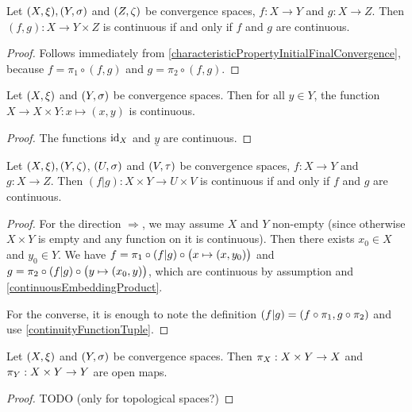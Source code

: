 \begin{lemma} \label{continuityFunctionTuple}
Let $\sSet{X,\xi}, \sSet{Y,\sigma}$ and $\sSet{Z,\zeta}$ be convergence spaces, $f: X\to Y$ and $g: X\to Z$. Then $(f,g): X\to Y\times Z$ is continuous \textup{if and only if} $f$ and $g$ are continuous.
\end{lemma}
\begin{proof}
Follows immediately from \ref{characteristicPropertyInitialFinalConvergence},
because $f = \pi_1\circ (f,g)$ and $g = \pi_2\circ (f,g)$.
\end{proof}
\begin{corollary} \label{continuousEmbeddingProduct}
Let $\sSet{X,\xi}$ and $\sSet{Y,\sigma}$ be convergence spaces. Then for all $y\in Y$, the function $X\to X\times Y: x\mapsto (x,y)$ is continuous.
\end{corollary}
\begin{proof}
The functions $\operatorname{id}_X$ and $\underline{y}$ are continuous.
\end{proof}

\begin{lemma} \label{continuityParallelComposition}
Let $\sSet{X,\xi}, \sSet{Y,\zeta}$, $\sSet{U,\sigma}$ and $\sSet{V,\tau}$ be convergence spaces, $f: X\to Y$ and $g: X\to Z$. Then $(f|g): X\times Y \to U\times V$ is continuous \textup{if and only if} $f$ and $g$ are continuous.
\end{lemma}
\begin{proof}
For the direction $\Rightarrow$, we may assume $X$ and $Y$ non-empty (since otherwise $X\times Y$ is empty and any function on it is continuous). Then there exists $x_0\in X$ and $y_0\in Y$. We have $f = \pi_1\circ (f|g) \circ \big(x\mapsto (x,y_0)\big)$ and $g = \pi_2\circ (f|g) \circ \big(y\mapsto (x_0, y)\big)$, which are continuous by assumption and \ref{continuousEmbeddingProduct}.

For the converse, it is enough to note the definition $(f|g) = (f\circ \pi_1, g\circ \pi_2)$ and use \ref{continuityFunctionTuple}.
\end{proof}

\begin{lemma}
Let $\sSet{X,\xi}$ and $\sSet{Y,\sigma}$ be convergence spaces. Then $\pi_X: X\times Y\to X$ and $\pi_Y: X\times Y\to Y$ are open maps.
\end{lemma}
\begin{proof}
TODO (only for topological spaces?)
\end{proof}

